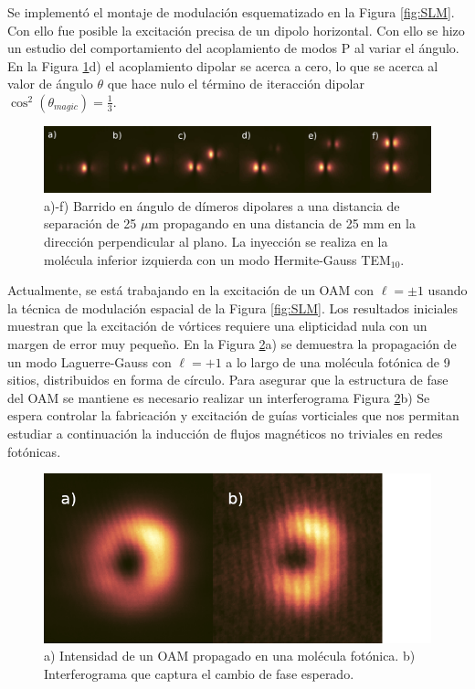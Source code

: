 \documentclass{article}
\begin{document}
Se implementó el montaje de modulación esquematizado en la Figura \ref{fig:SLM}. Con ello fue posible la excitación precisa de un dipolo horizontal. Con ello se hizo un estudio del comportamiento del acoplamiento de modos P al variar el ángulo. En la Figura \ref{fig:dipoles}d) el acoplamiento dipolar se acerca a cero, lo que se acerca al valor de ángulo $\theta$ que hace nulo el término de iteracción dipolar $\cos^2(\theta_{magic}) = \frac{1}{3}$.  

\begin{figure}[H]
	\centering
	\includegraphics[width=1.0\linewidth]{./media/dipoles.jpg}
	\caption{a)-f) Barrido en ángulo de dímeros dipolares a una distancia de separación de 25 $\mu$m propagando en una distancia de 25 mm en la dirección perpendicular al plano. La inyección se realiza en la molécula inferior izquierda con un modo Hermite-Gauss TEM$_{10}$. \label{fig:dipoles}}
\end{figure}

Actualmente, se está trabajando en la excitación de un OAM con $\ell = \pm 1$ usando la técnica de modulación espacial de la Figura \ref{fig:SLM}. Los resultados iniciales muestran que la excitación de vórtices requiere una elipticidad nula con un margen de error muy pequeño. En la Figura \ref{fig:vortex}a) se demuestra la propagación de un modo Laguerre-Gauss con $\ell = +1$ a lo largo de una molécula fotónica de 9 sitios, distribuidos en forma de círculo. Para asegurar que la estructura de fase del OAM se mantiene es necesario realizar un interferograma Figura \ref{fig:vortex}b) Se espera controlar la fabricación y excitación de guías vorticiales que nos permitan estudiar a continuación la inducción de flujos magnéticos no triviales en redes fotónicas.

\begin{figure}[H]
	\centering
	\includegraphics[width=0.7\linewidth]{./media/vortex.png}
	\caption{a) Intensidad de un OAM propagado en una molécula fotónica. b) Interferograma que captura el cambio de fase esperado. \label{fig:vortex}}
\end{figure} 
\end{document}
